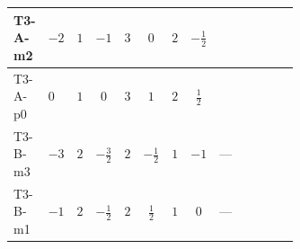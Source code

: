 \documentclass[8pt]{article}
\begin{document}
\begin{landscape}
\begin{longtable}{@{}llcccccc >{\raggedright\arraybackslash}p{0.21\linewidth} >{\raggedright\arraybackslash}p{0.21\linewidth} >{\raggedright\arraybackslash}p{0.21\linewidth}@{}}
T3-A-m2 & $-2$ & $1$ & $-1$ & $3$ & $0$ & $2$ & $-\frac{1}{2}$ & \scriptsize\adjustbox{max width=\linewidth}{$\begin{gathered} +\frac{1}{4} (2 \left({y_1}\,\left({y_1}\right)^{\dagger}\,{Y_e}\right)_{ij}+3 \left({y_2}\,\left({y_2}\right)^{\dagger}\,{Y_e}\right)_{ij}+6 \left({Y_e}\,\left({Y_e}\right)^{\dagger}\,{Y_e}\right)_{ij})\end{gathered}$} & \scriptsize\adjustbox{max width=\linewidth}{$\begin{gathered} -\frac{9}{4} {g_2}^2 \left({Y_e}\right)_{ij}\end{gathered}$} & \scriptsize\adjustbox{max width=\linewidth}{$\begin{gathered} -\frac{15}{4} {g_1}^2 \left({Y_e}\right)_{ij}\end{gathered}$} \\
\midrule
T3-A-p0 & $0$ & $1$ & $0$ & $3$ & $1$ & $2$ & $\frac{1}{2}$ & \scriptsize\adjustbox{max width=\linewidth}{$\begin{gathered} +\frac{1}{4} (2 \left({y_1}\,\left({y_1}\right)^{\dagger}\,{Y_e}\right)_{ij}+3 \left({y_2}\,\left({y_2}\right)^{\dagger}\,{Y_e}\right)_{ij}+6 \left({Y_e}\,\left({Y_e}\right)^{\dagger}\,{Y_e}\right)_{ij})\end{gathered}$} & \scriptsize\adjustbox{max width=\linewidth}{$\begin{gathered} -\frac{9}{4} {g_2}^2 \left({Y_e}\right)_{ij}\end{gathered}$} & \scriptsize\adjustbox{max width=\linewidth}{$\begin{gathered} -\frac{15}{4} {g_1}^2 \left({Y_e}\right)_{ij}\end{gathered}$} \\
\midrule
T3-B-m3 & $-3$ & $2$ & $-\frac{3}{2}$ & $2$ & $-\frac{1}{2}$ & $1$ & $-1$ & --- & \scriptsize\adjustbox{max width=\linewidth}{$\begin{gathered} -\frac{9}{4} {g_2}^2 \left({Y_e}\right)_{ij}\end{gathered}$} & \scriptsize\adjustbox{max width=\linewidth}{$\begin{gathered} -\frac{15}{4} {g_1}^2 \left({Y_e}\right)_{ij}\end{gathered}$} \\
\midrule
T3-B-m1 & $-1$ & $2$ & $-\frac{1}{2}$ & $2$ & $\frac{1}{2}$ & $1$ & $0$ & --- & \scriptsize\adjustbox{max width=\linewidth}{$\begin{gathered} -\frac{9}{4} {g_2}^2 \left({Y_e}\right)_{ij}\end{gathered}$} & \scriptsize\adjustbox{max width=\linewidth}{$\begin{gathered} -\frac{15}{4} {g_1}^2 \left({Y_e}\right)_{ij}\end{gathered}$} \\

\end{longtable}
\end{landscape}
\end{document}

